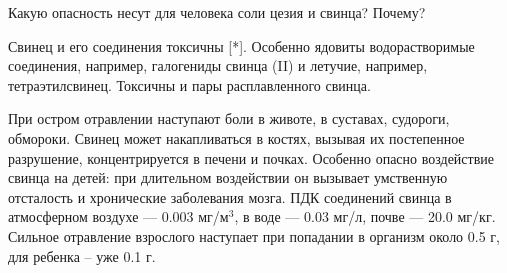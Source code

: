 
Какую опасность несут для человека соли цезия и свинца? Почему?

\explanationSection

Свинец и его соединения токсичны [*]. Особенно ядовиты водорастворимые соединения, например, галогениды свинца (II) и летучие, например, тетраэтилсвинец. Токсичны и пары расплавленного свинца.

При остром отравлении наступают боли в животе, в суставах, судороги, обмороки. Свинец может накапливаться в костях, вызывая их постепенное разрушение, концентрируется в печени и почках. Особенно опасно воздействие свинца на детей: при длительном воздействии он вызывает умственную отсталость и хронические заболевания мозга. ПДК соединений свинца в атмосферном воздухе — 0.003 мг/м$^3$, в воде — 0.03 мг/л, почве — 20.0 мг/кг. Сильное отравление взрослого наступает при попадании в организм около 0.5 г, для ребенка – уже 0.1 г.